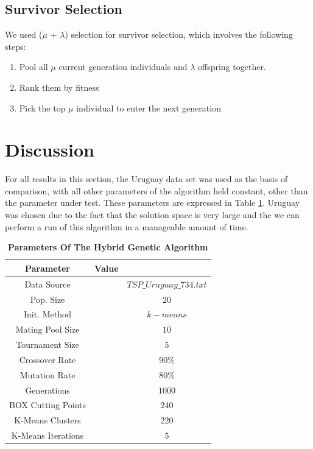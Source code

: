 \documentclass[12pt,twocolumn,oneside]{osajnl}
\begin{document}
\subsection{Survivor Selection}
We used ($\mu$ + $\lambda$) selection for survivor selection, which involves the following steps:

\begin{enumerate}
    \item Pool all $\mu$ current generation individuals and $\lambda$ offspring together.
    \item Rank them by fitness
    \item Pick the top $\mu$ individual to enter the next generation
\end{enumerate}



\section{Discussion}
For all results in this section, the Uruguay data set was used as the basis of comparison, with all other parameters of the algorithm held constant, other than the parameter under test. These parameters are expressed in Table \ref{tab:parameters}. Uruguay was chosen due to the fact that the solution space is very large and the we can perform a run of this algorithm in a manageable amount of time.
\begin{table}[htbp]
\centering
\caption{\bf Parameters Of The Hybrid Genetic Algorithm}
\begin{tabular}{ccc}
\hline
Parameter & Value \\
\hline
Data Source && $TSP\_Uruguay\_734.txt$ \\
Pop. Size && $20$ \\
Init. Method && $k-means$ \\
Mating Pool Size && $10$ \\
Tournament Size && $5$ \\
Crossover Rate && $90\%$ \\
Mutation Rate && $80\%$ \\
Generations && $1000$ \\
BOX Cutting Points && $240$ \\
K-Means Clusters && $220$ \\
K-Means Iterations && $5$ \\


\hline
\end{tabular}
  \label{tab:parameters}
\end{table}
\end{document}

